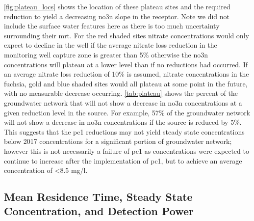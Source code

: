 \autoref{fig:plateau_locs} shows the location of these plateau sites and the required reduction to yield a decreasing \gls{no3n} slope in the receptor.
Note we did not include the surface water features here as there is too much uncertainty surrounding their \gls{mrt}.
For the red shaded sites nitrate concentrations would only expect to decline in the well if the average nitrate loss reduction in the monitoring well capture zone is greater than 5\% otherwise the \gls{no3n} concentrations will plateau at a lower level than if no reductions had occurred.
If an average nitrate loss reduction of 10\% is assumed, nitrate concentrations in the fuchsia, gold and blue shaded sites would all plateau at some point in the future, with no measurable decrease occurring.
\autoref{tab:plateau} shows the percent of the groundwater network that will not show a decrease in \gls{no3n} concentrations at a given reduction level in the source.
For example, 57\% of the groundwater network will not show a decrease in \gls{no3n} concentrations if the source is reduced by 5\%.
This suggests that the \gls{pc1} reductions may not yield steady state concentrations below 2017 concentrations for a significant portion of groundwater network; however this is not necessarily a failure of \gls{pc1} as concentrations were expected to continue to increase after the implementation of \gls{pc1}, but to achieve an average concentration of <8.5 mg/l.


\begin{landscape}
\end{landscape}

\subsection[Mean Residence Time Impacts]{Mean Residence Time, Steady State Concentration, and Detection Power} \label{sec:mrt_results}

